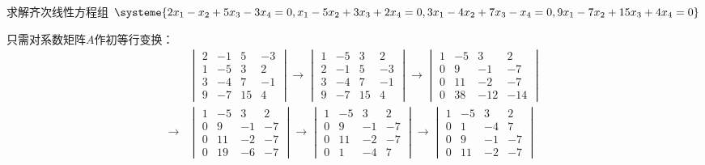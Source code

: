 \vspace{1.5em}

\begin{eg}
求解齐次线性方程组
$\systeme{2x_1 - x_2 + 5x_3 - 3x_4 = 0, x_1 - 5x_2 + 3x_3 + 2x_4 = 0, 3x_1 - 4x_2 + 7x_3 - x_4 = 0, 9x_1 - 7x_2 + 15x_3 + 4x_4 = 0}$
\end{eg}
\begin{solution}
只需对系数矩阵$A$作初等行变换：
\begin{align*}
& \begin{vmatrix} 2 & -1 & 5 & -3 \\ 1 & -5 & 3 & 2 \\ 3 & -4 & 7 & -1 \\ 9 & -7 & 15 & 4 \end{vmatrix} \longrightarrow \begin{vmatrix} 1 & -5 & 3 & 2 \\ 2 & -1 & 5 & -3 \\ 3 & -4 & 7 & -1 \\ 9 & -7 & 15 & 4 \end{vmatrix} \longrightarrow \begin{vmatrix} 1 & -5 & 3 & 2 \\ 0 & 9 & -1 & -7 \\ 0 & 11 & -2 & -7 \\ 0 & 38 & -12 & -14 \end{vmatrix} \\
\longrightarrow & \begin{vmatrix} 1 & -5 & 3 & 2 \\ 0 & 9 & -1 & -7 \\ 0 & 11 & -2 & -7 \\ 0 & 19 & -6 & -7 \end{vmatrix} \longrightarrow \begin{vmatrix} 1 & -5 & 3 & 2 \\ 0 & 9 & -1 & -7 \\ 0 & 11 & -2 & -7 \\ 0 & 1 & -4 & 7 \end{vmatrix} \longrightarrow \begin{vmatrix} 1 & -5 & 3 & 2 \\ 0 & 1 & -4 & 7 \\ 0 & 9 & -1 & -7 \\ 0 & 11 & -2 & -7 \end{vmatrix} \\

\end{align*}
\end{solution}
